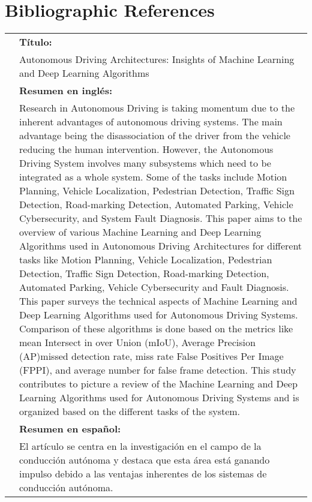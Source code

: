 \documentclass[10pt,letterpaper,final]{article}
\begin{document}
    \section*{Bibliographic References}
    \begin{center}
        \begin{tabularx}{\textwidth}{|X|}
            \hline
            & \textbf{Título:} \\
            & Autonomous Driving Architectures: Insights of Machine Learning and Deep Learning Algorithms~\cite{alam2022cost} \\
            & \textbf{Resumen en inglés:} \\
            & Research in Autonomous Driving is taking momentum due to the inherent advantages of autonomous driving
            systems. The main advantage being the disassociation of the driver from the vehicle reducing the human
            intervention. However, the Autonomous Driving System involves many subsystems which need to be integrated as
            a whole system. Some of the tasks include Motion Planning, Vehicle Localization, Pedestrian Detection,
            Traffic Sign Detection, Road-marking Detection, Automated Parking, Vehicle Cybersecurity, and System Fault
            Diagnosis. This paper aims to the overview of various Machine Learning and Deep Learning Algorithms used in
            Autonomous Driving Architectures for different tasks like Motion Planning, Vehicle Localization, Pedestrian
            Detection, Traffic Sign Detection, Road-marking Detection, Automated Parking, Vehicle Cybersecurity and
            Fault Diagnosis. This paper surveys the technical aspects of Machine Learning and Deep Learning Algorithms
            used for Autonomous Driving Systems. Comparison of these algorithms is done based on the metrics like mean
            Intersect in over Union (mIoU), Average Precision (AP)missed detection rate, miss rate False Positives Per
            Image (FPPI), and average number for false frame detection. This study contributes to picture a review of
            the Machine Learning and Deep Learning Algorithms used for Autonomous Driving Systems and is organized based
            on the different tasks of the system. \\
            & \textbf{Resumen en español:} \\
            & El artículo se centra en la investigación en el campo de la conducción autónoma y destaca que esta área
            está ganando impulso debido a las ventajas inherentes de los sistemas de conducción autónoma.

\end{tabularx}
\end{center}
\end{document}
